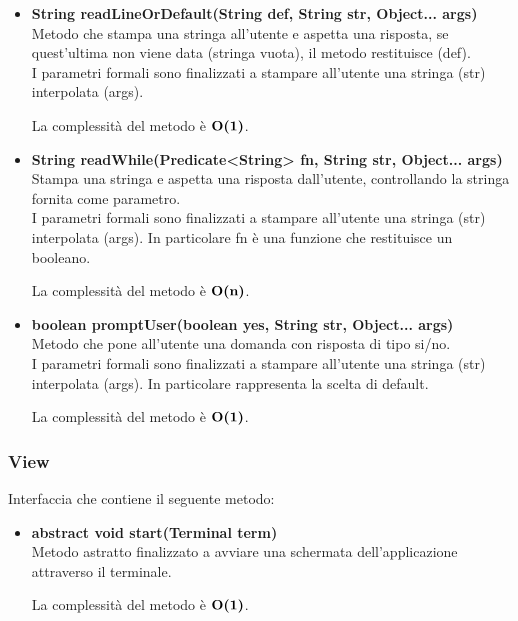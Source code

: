 \documentclass[a4paper, 12pt]{scrreprt}
\begin{document}
\begin{itemize}
					\item \textbf{String readLineOrDefault(String def, String str, Object... args)}
					\\Metodo che stampa una stringa all'utente e aspetta una risposta, se quest'ultima non viene data (stringa vuota), il metodo restituisce (def).
					\\I parametri formali sono finalizzati a stampare all'utente una stringa (str) interpolata (args).
					
					La complessit\`a del metodo \`e $\mathbf{O}\textbf{(1)}$.
					
					\item \textbf{String readWhile(Predicate<String> fn, String str, Object... args)}
					\\Stampa una stringa e aspetta una risposta dall'utente, controllando la stringa fornita come parametro.
					\\I parametri formali sono finalizzati a stampare all'utente una stringa (str) interpolata (args). In particolare fn \`e una funzione che restituisce un booleano.
					
					La complessit\`a del metodo \`e $\mathbf{O}\textbf{(n)}$.
	
					\item \textbf{boolean promptUser(boolean yes, String str, Object... args)}
					\\Metodo che pone all'utente una domanda con risposta di tipo si/no.
					\\I parametri formali sono finalizzati a stampare all'utente una stringa (str) interpolata (args). In particolare rappresenta la scelta di default.
					
					La complessit\`a del metodo \`e $\mathbf{O}\textbf{(1)}$.
					
				\end{itemize}

				\subsubsection{View}
				Interfaccia che contiene il seguente metodo:
				\begin{itemize}
					\item \textbf{abstract void start(Terminal term)}
					\\Metodo astratto finalizzato a avviare una schermata dell'applicazione attraverso il terminale.
					
					La complessit\`a del metodo \`e $\mathbf{O}\textbf{(1)}$.
				\end{itemize}
\end{document}
